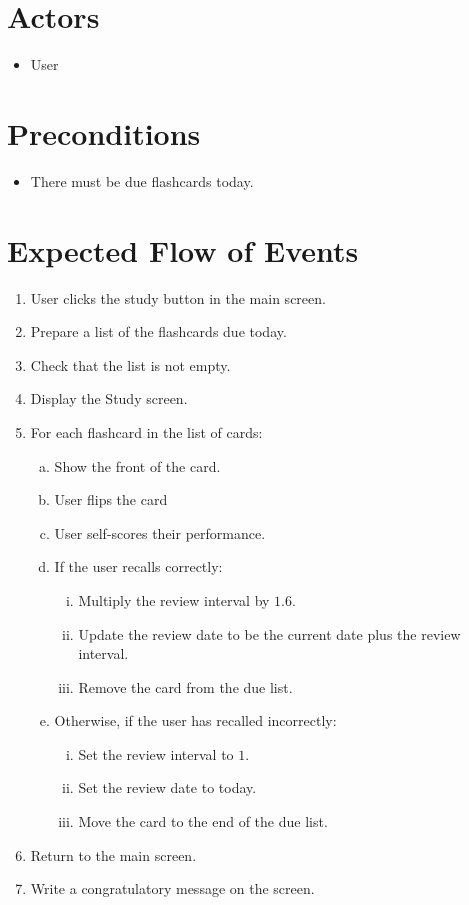\documentclass{scrreprt}
\begin{document}
\section{Actors}
\begin{itemize}
    \item User
\end{itemize}

\section{Preconditions}
\begin{itemize}
    \item There must be due flashcards today.
\end{itemize}

\section{Expected Flow of Events}
\begin{enumerate}[1.]
    \item User clicks the study button in the main screen.
    \item Prepare a list of the flashcards due today.
    \item Check that the list is not empty.
    \item Display the Study screen.
    \item For each flashcard in the list of cards:
    \begin{enumerate}[a.]
        \item Show the front of the card.
        \item User flips the card
        \item User self-scores their performance.
        \item If the user recalls correctly:
        \begin{enumerate}[i)]
            \item Multiply the review interval by $1.6$.
            \item Update the review date to be the current date plus the review interval.
            \item Remove the card from the due list.
        \end{enumerate}
        \item Otherwise, if the user has recalled incorrectly:
        \begin{enumerate}[i)]
            \item Set the review interval to $1$.
            \item Set the review date to today.
            \item Move the card to the end of the due list.
        \end{enumerate}
    \end{enumerate}
    \item Return to the main screen.
    \item Write a congratulatory message on the screen. 
\end{enumerate}
\end{document}
